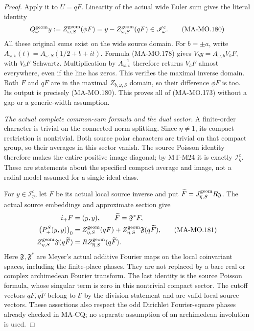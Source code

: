 \begin{proof}
Apply it to \(U=qF\). Linearity of the actual wide Euler
sum gives the literal identity
\[
       Q^{\rm geom}_\omega y
          :=Z^{\rm geom}_{\omega,S}(\phi F)
           =y-Z^{\rm geom}_{\omega,S}(qF)
                                   \in\mathscr I^c_\omega.
 \tag{MA-MO.180}
\]
All these original sums exist on the wide source domain.
For \(b=\pm a\), write
\(A_{\omega,b}(t)=A_{\omega,S}(1/2+b+it)\).
Formula (MA-MO.178) gives
\(V_by=A_{\omega,b}V_bF\), with \(V_bF\) Schwartz.
Multiplication by \(A_{\omega,b}^{-1}\) therefore returns
\(V_bF\) almost everywhere, even if the line has zeros.
This verifies the maximal inverse domain. Both \(F\) and
\(qF\) are in the maximal \(Z_{b,\omega,S}\) domain, so
their difference \(\phi F\) is too. Its output is precisely
(MA-MO.180). This proves all of (MA-MO.173) without a gap
or a generic-width assumption.

\emph{The actual complete common-sum formula and the dual sector.}
A finite-order character is trivial on the connected norm
splitting. Since \(\eta\ne1\), its compact restriction is
nontrivial. Both source polar characters are trivial on that
compact group, so their averages in this sector vanish.
The source Poisson identity therefore makes the entire
positive image diagonal; by MT-M24 it is exactly
\(\mathscr I^c_\eta\). These are statements about the
specified compact average and image, not a radial model
assumed for a single ideal class.

For \(y\in\mathscr I^c_\eta\), let \(F\) be its actual
local source inverse and put
\(\widetilde F=J^{\rm geom}_{\overline\eta,S}Ry\).
The actual source embeddings and approximate section give
\[
 \begin{aligned}
 i_+F&=(y,y),\qquad
            \widetilde F=\mathfrak F^*F,\\
 \bigl(P_+^S(y,y)\bigr)_0
       &=Z^{\rm geom}_{\eta,S}(qF)
          +Z^{\rm geom}_{\eta,S}\mathfrak F(q\widetilde F),\\
 Z^{\rm geom}_{\eta,S}\mathfrak F(q\widetilde F)
       &=RZ^{\rm geom}_{\overline\eta,S}(q\widetilde F).
 \end{aligned}
 \tag{MA-MO.181}
\]
Here \(\mathfrak F,\mathfrak F^*\) are Meyer's actual
additive Fourier maps on the local coinvariant spaces,
including the finite-place phases. They are not replaced
by a bare real or complex archimedean Fourier transform.
The last identity is the source Poisson formula, whose
singular term is zero in this nontrivial compact sector.
The cutoff vectors \(qF,q\widetilde F\) belong to
\(\mathcal E\) by the division statement and are valid
local source vectors. These assertions also respect the
odd Dirichlet Fourier-square phases already checked in
MA-CQ; no separate assumption of an archimedean involution
is used.


\end{proof}
